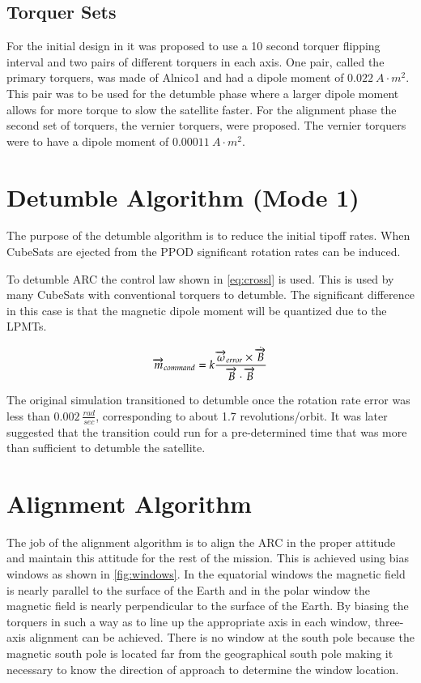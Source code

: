 \subsection{Torquer Sets}

For the initial design in \cite{Mentch11} it was proposed to use a 10 second torquer flipping interval and two pairs of different torquers in each axis. One pair, called the primary torquers, was made of Alnico1 and had a dipole moment of $0.022~\unit{A}{\cdot}\unit{m^2}$. This pair was to be used for the detumble phase where a larger dipole moment allows for more torque to slow the satellite faster. For the alignment phase the second set of torquers, the vernier torquers, were proposed. The vernier torquers were to have a dipole moment of $0.00011~\unit{A}{\cdot}\unit{m^2}$.

\section{Detumble Algorithm (Mode 1)}

The purpose of the detumble algorithm is to reduce the initial tipoff rates. When CubeSats are ejected from the \ac{PPOD} significant rotation rates can be induced.

To detumble \ac{ARC} the control law shown in \cref{eq:crossl} is used. This is used by many CubeSats with conventional torquers to detumble. The significant difference in this case is that the magnetic dipole moment will be quantized due to the \acp{LPMT}.

\begin{equation}
    \overrightarrow{m}_{command} = k {\frac{\overrightarrow{\omega}_{error} \times \dot{\overrightarrow{B}}}{\overrightarrow{B} \cdot \overrightarrow{B}}}
    \label{eq:crossl}
\end{equation}

The original simulation transitioned to detumble once the rotation rate error was less than $0.002~\unit{\frac{rad}{sec}}$, corresponding to about 1.7 revolutions/orbit. It was later suggested that the transition could run for a pre-determined time that was more than sufficient to detumble the satellite.

\section{Alignment Algorithm}

The job of the alignment algorithm is to align the \ac{ARC} in the proper attitude and maintain this attitude for the rest of the mission. This is achieved using bias windows as shown in \cref{fig:windows}. In the equatorial windows the magnetic field is nearly parallel to the surface of the Earth and in the polar window the magnetic field is nearly perpendicular to the surface of the Earth. By biasing the torquers in such a way as to line up the appropriate axis in each window, three-axis alignment can be achieved. There is no window at the south pole because the magnetic south pole is located far from the geographical south pole making it necessary to know the direction of approach to determine the window location.

